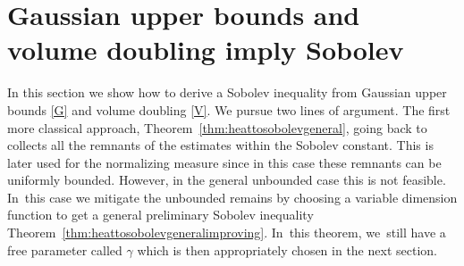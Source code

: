 \documentclass[10pt]{amsart}
\theoremstyle{plain}
\theoremstyle{definition}
\begin{document}
\section{{Gaussian} upper bounds and {volume} doubling imply Sobolev}\label{section:GS}

In this section we show how to derive a Sobolev inequality from Gaussian upper bounds \eqref{G} and volume doubling \eqref{V}. We pursue two lines of argument. The first more classical approach, Theorem~\ref{thm:heattosobolevgeneral}, going back to \cite{Varopoulos-85} collects all the remnants of the estimates within the Sobolev constant. This is later used for the normalizing measure since in this case these remnants can be uniformly bounded. However, in the general unbounded case this is not feasible. In~this case we mitigate the unbounded remains by choosing a variable dimension function to get a general preliminary Sobolev inequality Theorem~\ref{thm:heattosobolevgeneralimproving}. In~this theorem, we~still have a free parameter called $ \gamma $ which is then appropriately chosen in the next section.
\end{document}
